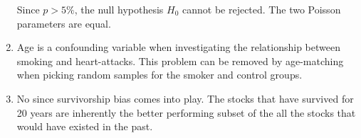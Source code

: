 \begin{enumerate}
	Since $ p > 5\% $, the null hypothesis $ H_0 $ cannot be rejected. The two Poisson parameters are equal.
	
	\item Age is a confounding variable when investigating the relationship between smoking and heart-attacks. This problem can be removed by age-matching when picking random samples for the smoker and control groups.
	
	\item No since survivorship bias comes into play. The stocks that have survived for 20 years are inherently the better performing subset of the all the stocks that would have existed in the past.
	
\end{enumerate}